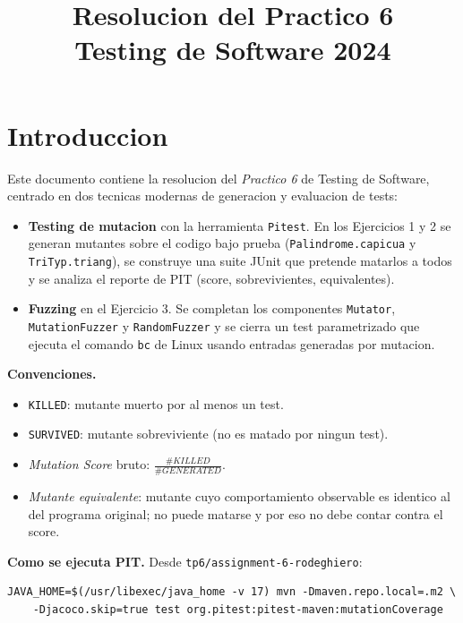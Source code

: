 \documentclass[12pt,a4paper]{article}
\title{\textbf{Resolucion del Practico 6}\\Testing de Software 2024}
\author{}
\date{}
\begin{document}
\maketitle
\tableofcontents
\newpage

\section*{Introduccion}

Este documento contiene la resolucion del \textit{Practico 6} de Testing de Software, centrado
en dos tecnicas modernas de generacion y evaluacion de tests:

\begin{itemize}
  \item \textbf{Testing de mutacion} con la herramienta \texttt{Pitest}. En los Ejercicios 1 y 2
  se generan mutantes sobre el codigo bajo prueba (\texttt{Palindrome.capicua} y
  \texttt{TriTyp.triang}), se construye una suite JUnit que pretende matarlos a todos y se
  analiza el reporte de PIT (score, sobrevivientes, equivalentes).
  \item \textbf{Fuzzing} en el Ejercicio 3. Se completan los componentes \texttt{Mutator},
  \texttt{MutationFuzzer} y \texttt{RandomFuzzer} y se cierra un test parametrizado que ejecuta
  el comando \texttt{bc} de Linux usando entradas generadas por mutacion.
\end{itemize}

\textbf{Convenciones.}

\begin{itemize}
  \item \texttt{KILLED}: mutante muerto por al menos un test.
  \item \texttt{SURVIVED}: mutante sobreviviente (no es matado por ningun test).
  \item \emph{Mutation Score} bruto: $\frac{\#KILLED}{\#GENERATED}$.
  \item \emph{Mutante equivalente}: mutante cuyo comportamiento observable es identico al del
  programa original; no puede matarse y por eso no debe contar contra el score.
\end{itemize}

\textbf{Como se ejecuta PIT.} Desde \texttt{tp6/assignment-6-rodeghiero}:

\begin{lstlisting}[style=codestyle]
JAVA_HOME=$(/usr/libexec/java_home -v 17) mvn -Dmaven.repo.local=.m2 \
    -Djacoco.skip=true test org.pitest:pitest-maven:mutationCoverage
\end{lstlisting}
\end{document}
